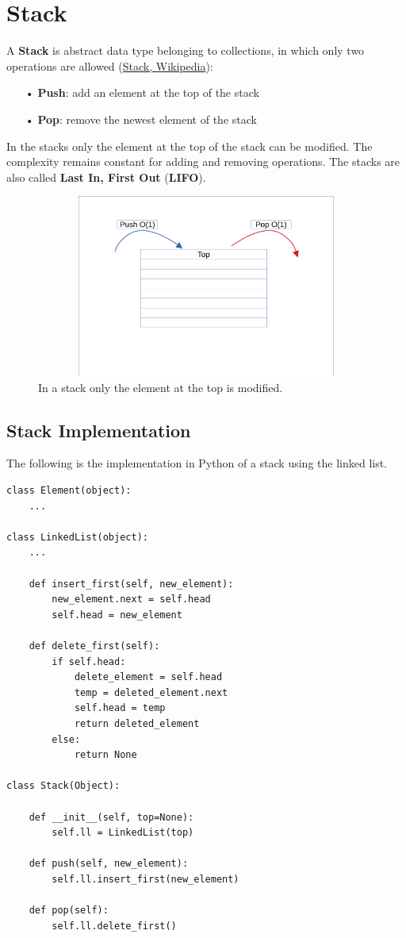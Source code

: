 \section{Stack}
A \textbf{Stack} is abstract data type belonging to collections, in which only two operations are allowed \cite{wikistack} (\href{https://en.wikipedia.org/wiki/Stack_(abstract_data_type)}{Stack, Wikipedia}):
\begin{itemize}
\item[•] \textbf{Push}: add an element at the top of the stack
\item[•] \textbf{Pop}: remove the newest element of the stack
\end{itemize}
In the stacks only the element at the top of the stack can be modified. The complexity remains constant for adding and removing operations. The stacks are also called \textbf{Last In, First Out} (\textbf{LIFO}).
\begin{figure}[h]
	\includegraphics[width=14cm,height=6cm]{chapters/datastructures/images/stack_1.pdf}
	\caption[]{In a stack only the element at the top is modified.}
	\label{stack_1}
\end{figure}
\subsection{Stack Implementation}
The following is the implementation in Python of a stack using the linked list.
\begin{lstlisting}[caption={Stack implementation.}]
class Element(object):
	...

class LinkedList(object):
	...
	
	def insert_first(self, new_element):
		new_element.next = self.head
		self.head = new_element
	
	def delete_first(self):
		if self.head:
			delete_element = self.head
			temp = deleted_element.next
			self.head = temp
			return deleted_element
		else:
			return None

class Stack(Object):
	
	def __init__(self, top=None):
		self.ll = LinkedList(top)
		
	def push(self, new_element):
		self.ll.insert_first(new_element)
	
	def pop(self):
		self.ll.delete_first()
\end{lstlisting}

